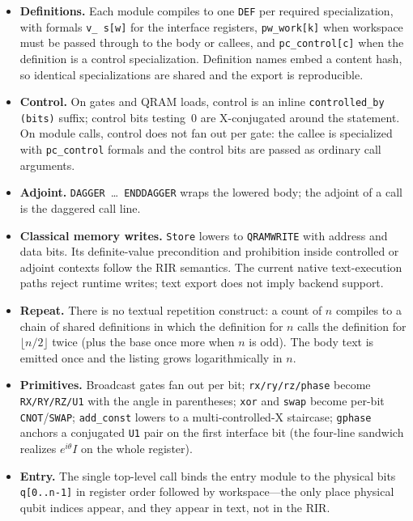 \begin{itemize}
\item \textbf{Definitions.}  Each module compiles to one \texttt{DEF} per
  required specialization, with formals \texttt{v\_\ s[w]} for the
  interface registers, \texttt{pw\_work[k]} when workspace must be passed
  through to the body or callees, and \texttt{pc\_control[c]} when the
  definition is a control specialization.  Definition names embed a
  content hash, so identical specializations are shared and the export is
  reproducible.
\item \textbf{Control.}  On gates and QRAM loads, control is an inline
  \texttt{controlled\_by (bits)} suffix; control bits testing~0 are
  X-conjugated around the statement.  On module calls, control does not
  fan out per gate: the callee is specialized with \texttt{pc\_control}
  formals and the control bits are passed as ordinary call arguments.
\item \textbf{Adjoint.}  \texttt{DAGGER}~\dots~\texttt{ENDDAGGER} wraps the
  lowered body; the adjoint of a call is the daggered call line.
\item \textbf{Classical memory writes.}  \texttt{Store} lowers to
  \texttt{QRAMWRITE} with address and data bits. Its definite-value
  precondition and prohibition inside controlled or adjoint contexts
  follow the RIR semantics. The current native text-execution paths
  reject runtime writes; text export does not imply backend support.
\item \textbf{Repeat.}  There is no textual repetition construct: a count
  of $n$ compiles to a chain of shared definitions in which the definition
  for $n$ calls the definition for $\lfloor n/2 \rfloor$ twice (plus the
  base once more when $n$ is odd).  The body text is emitted once and the
  listing grows logarithmically in $n$.
\item \textbf{Primitives.}  Broadcast gates fan out per bit;
  \texttt{rx/ry/rz/phase} become \texttt{RX/RY/RZ/U1} with the angle in
  parentheses; \texttt{xor} and \texttt{swap} become per-bit
  \texttt{CNOT}/\texttt{SWAP}; \texttt{add\_const} lowers to a
  multi-controlled-X staircase; \texttt{gphase} anchors a conjugated
  \texttt{U1} pair on the first interface bit (the four-line sandwich
  realizes $e^{i\theta}I$ on the whole register).
\item \textbf{Entry.}  The single top-level call binds the entry module to
  the physical bits \texttt{q[0..n-1]} in register order followed by
  workspace---the only place physical qubit indices appear, and they
  appear in text, not in the RIR.
\end{itemize}

